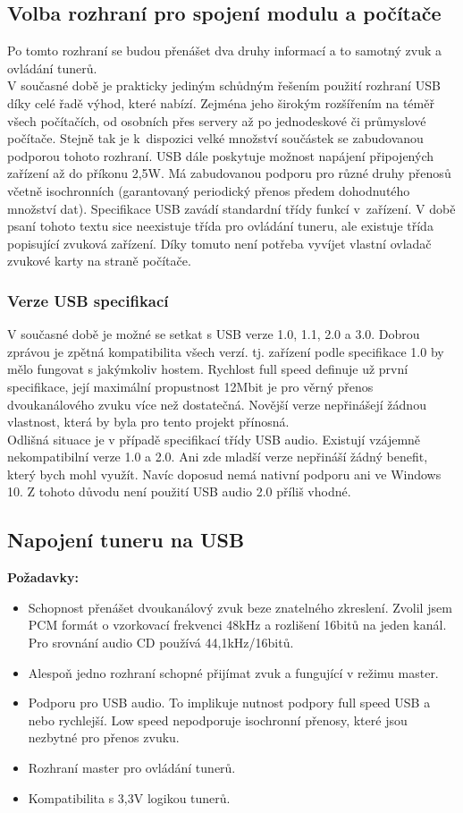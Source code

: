 \subsection{Volba rozhraní pro spojení modulu a počítače}
Po tomto rozhraní se budou přenášet dva druhy informací a to samotný zvuk a ovládání tunerů.\\
V současné době je prakticky jediným schůdným řešením použití rozhraní USB díky celé řadě výhod, které nabízí. Zejména jeho širokým rozšířením na téměř všech počítačích, od osobních přes servery až po jednodeskové či průmyslové počítače. Stejně tak je k~dispozici velké množství součástek se zabudovanou podporou tohoto rozhraní. USB dále poskytuje možnost napájení připojených zařízení až do příkonu 2,5W. Má zabudovanou podporu pro různé druhy přenosů včetně isochronních (garantovaný periodický přenos předem dohodnutého množství dat). Specifikace USB zavádí standardní třídy funkcí v~zařízení. V době psaní tohoto textu sice neexistuje třída pro ovládání tuneru, ale existuje třída popisující zvuková zařízení. Díky tomuto není potřeba vyvíjet vlastní ovladač zvukové karty na straně počítače.
\subsubsection{Verze USB specifikací}
V současné době je možné se setkat s USB verze 1.0, 1.1, 2.0 a 3.0. Dobrou zprávou je zpětná kompatibilita všech verzí. tj. zařízení podle specifikace 1.0 by mělo fungovat s jakýmkoliv hostem. Rychlost full speed definuje už první specifikace, její maximální propustnost 12Mbit je pro věrný přenos dvoukanálového zvuku více než dostatečná. Novější verze nepřinášejí žádnou vlastnost, která by byla pro tento projekt přínosná.\\
Odlišná situace je v případě specifikací třídy USB audio. Existují vzájemně nekompatibilní verze 1.0 a 2.0. Ani zde mladší verze nepřináší žádný benefit, který bych mohl využít. Navíc doposud nemá nativní podporu ani ve Windows 10. Z tohoto důvodu není použití USB audio 2.0 příliš vhodné.


\subsection{Napojení tuneru na USB}
\textbf{Požadavky:\\}
\begin{itemize}
\item{Schopnost přenášet dvoukanálový zvuk beze znatelného zkreslení. Zvolil jsem PCM formát o vzorkovací frekvenci 48kHz a rozlišení 16bitů na jeden kanál. Pro srovnání audio CD používá 44,1kHz/16bitů.}
\item{Alespoň jedno rozhraní \iis schopné přijímat zvuk a fungující v režimu master.}
\item{Podporu pro USB audio. To implikuje nutnost podpory full speed USB a nebo rychlejší. Low speed nepodporuje isochronní přenosy, které jsou nezbytné pro přenos zvuku.}
\item{Rozhraní \iic master pro ovládání tunerů.}
\item{Kompatibilita s 3,3V logikou tunerů.}
\end{itemize}

